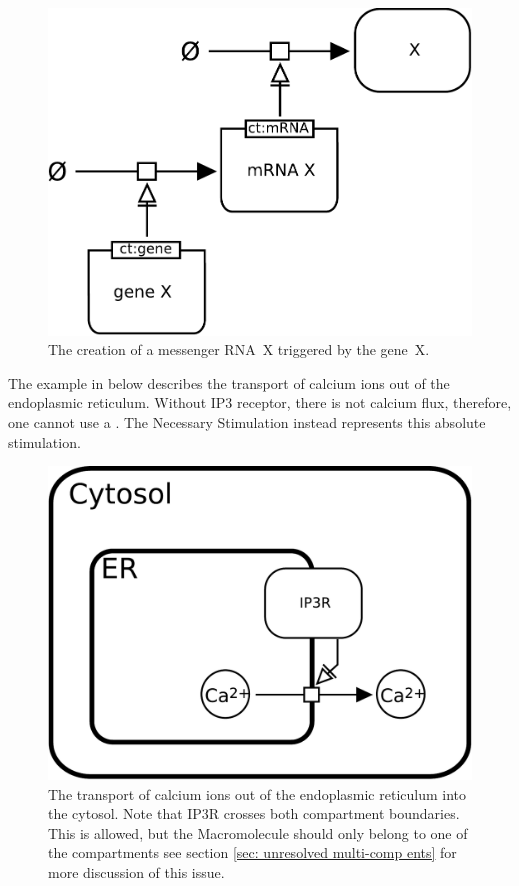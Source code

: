 \begin{figure}[H]
  \centering
  \includegraphics[scale = 0.4]{examples/necessary_stim-genetic}
  \caption{The creation of a messenger RNA~X triggered by the gene~X.}
  \label{fig:necessary_stim-gene}
\end{figure}


The example in  below describes the transport of calcium ions out of the endoplasmic reticulum. Without IP3 receptor, there is not calcium flux, therefore, one cannot use a . The Necessary Stimulation instead represents this absolute stimulation.

\begin{figure}[H]
  \centering
  \includegraphics[scale = 0.3]{examples/necessary_stim-transport}
  \caption{The transport of calcium ions out of the endoplasmic reticulum into the cytosol. Note that IP3R crosses both compartment boundaries. This is allowed, but the Macromolecule should only belong to one of the compartments see section \ref{sec: unresolved multi-comp ents} for more discussion of this issue.}
  \label{fig:necessary_stim-calcium}
\end{figure}



